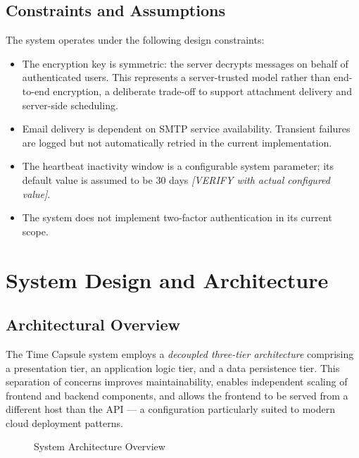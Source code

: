 \documentclass[12pt, a4paper]{article}
\begin{document}
\subsection{Constraints and Assumptions}

The system operates under the following design constraints:
\begin{itemize}
  \item The encryption key is symmetric: the server decrypts messages on behalf of authenticated users. This represents a server-trusted model rather than end-to-end encryption, a deliberate trade-off to support attachment delivery and server-side scheduling.
  \item Email delivery is dependent on SMTP service availability. Transient failures are logged but not automatically retried in the current implementation.
  \item The heartbeat inactivity window is a configurable system parameter; its default value is assumed to be 30 days \textit{[VERIFY with actual configured value]}.
  \item The system does not implement two-factor authentication in its current scope.
\end{itemize}

\section{System Design and Architecture}
\label{sec:design}

\subsection{Architectural Overview}

The Time Capsule system employs a \textit{decoupled three-tier architecture} comprising a presentation tier, an application logic tier, and a data persistence tier. This separation of concerns improves maintainability, enables independent scaling of frontend and backend components, and allows the frontend to be served from a different host than the API — a configuration particularly suited to modern cloud deployment patterns.

\begin{figure}[H]
  \centering
  \caption{System Architecture Overview}
  \label{fig:architecture}
\end{figure}
\end{document}
